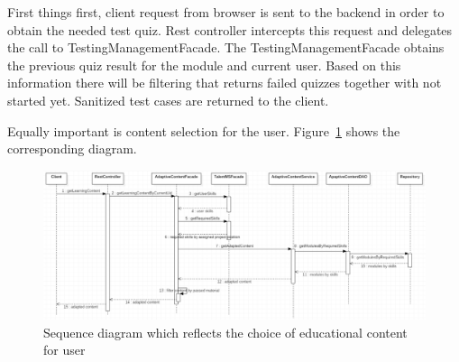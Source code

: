 \documentclass[a4paper,14pt,oneside,final]{extarticle}
\begin{document}
First things first, client request from browser is sent to the backend in order to obtain the needed test quiz. Rest controller intercepts this request and delegates the call to TestingManagementFacade.  The TestingManagementFacade obtains the previous quiz result for the module and current user. Based on this information there will be filtering that returns failed quizzes together with not started yet. Sanitized test cases are returned to the client. 

Equally important is content selection for the user. Figure~\ref{fig:7} shows the corresponding diagram.

\begin{figure}[H]
    \centering
    \includegraphics[width=1\textwidth]{fig7}
    \caption{Sequence diagram which reflects the choice of educational content for user}
    \label{fig:7}
\end{figure}
\end{document}
